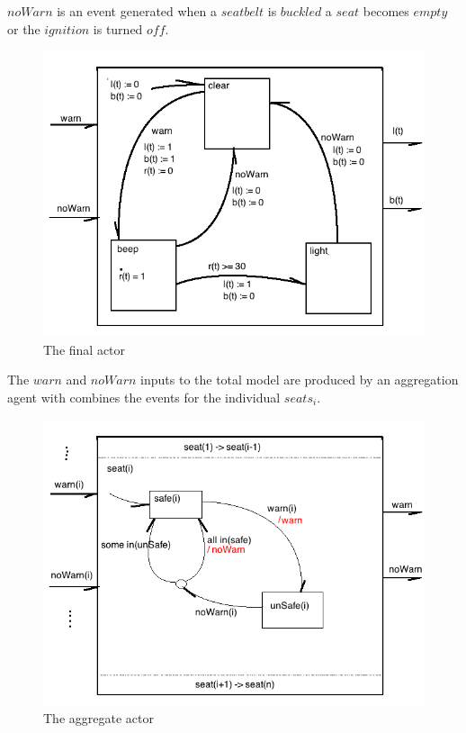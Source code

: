 \documentclass{article}
\begin{document}
$noWarn$ is an event generated when a $seatbelt$ is $buckled$
a $seat$ becomes $empty$ or the $ignition$ is turned $off$.

\begin{figure}[h!]
\centering
\includegraphics[scale=0.7]{hw7_4b_actor_total.png}
\caption{The final actor}
\label{fig:4b_actor_total}
\end{figure}

The $warn$ and $noWarn$ inputs to the total model are
produced by an aggregation agent with combines the
events for the individual $seats_i$.

\begin{figure}[h!]
\centering
\includegraphics[scale=0.7]{hw7_4b_actor_aggr.png}
\caption{The aggregate actor}
\label{fig:4b_actor_aggr}
\end{figure}
\end{document}
